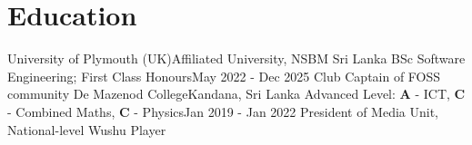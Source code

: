\section{Education}
  \resumeSubHeadingListStart
    \resumeSubheading
      {University of Plymouth (UK)}{Affiliated University, NSBM Sri Lanka}
      {BSc Software Engineering; First Class Honours}{May 2022 - Dec 2025}
      \resumeItemListStart
          {Club Captain of FOSS community}
      \resumeItemListEnd
    \resumeSubheading
      {De Mazenod College}{Kandana, Sri Lanka}
      {Advanced Level: \textbf{A} - ICT, \textbf{C} - Combined Maths, \textbf{C} - Physics}{Jan 2019 - Jan 2022}
      \resumeItemListStart
          {President of Media Unit, National-level Wushu Player}
      \resumeItemListEnd
  \resumeSubHeadingListEnd
